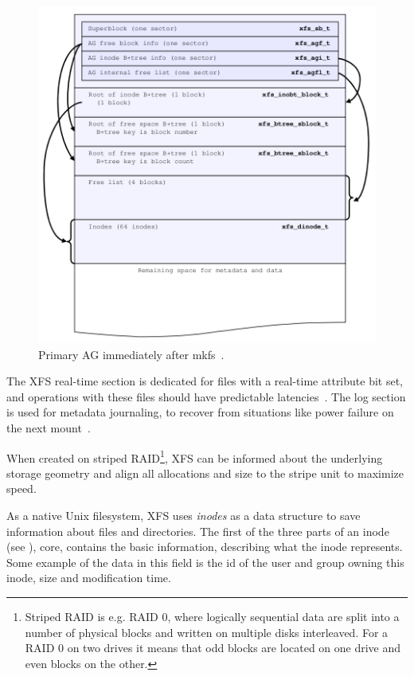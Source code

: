 \begin{figure}
  \centering
 \includegraphics[width=13cm,keepaspectratio]{fig/primary-ag} %
 \caption{Primary AG immediately after mkfs~\cite[Ch. 3]{xfsStructure}.}
\label{fig:xfs:primaryAG}
\end{figure}
	
The XFS real-time section is dedicated for files with a real-time attribute
bit set, and operations with these files should have predictable
latencies~\cite{xfsRealtime}. The log section is used for metadata journaling, to recover from situations like power failure on the next mount~\cite{xfsStructure,xfsman}.

When created on striped RAID\footnote{Striped RAID is e.g. RAID 0, where
logically sequential data are split into a number of physical blocks and
written on multiple disks interleaved. For a RAID 0 on two drives it means
that odd blocks are located on one drive and even blocks on the other.},
XFS can be informed about the underlying storage geometry and align all allocations and size to the stripe unit to maximize speed.

As a native Unix filesystem, XFS uses {\em inodes} as a data structure to save information about files and directories. The first of the three parts of an inode (see ), core, contains the basic information, describing what the inode represents. Some example of the data in this field is the id of the user and group owning this inode, size and modification time.

